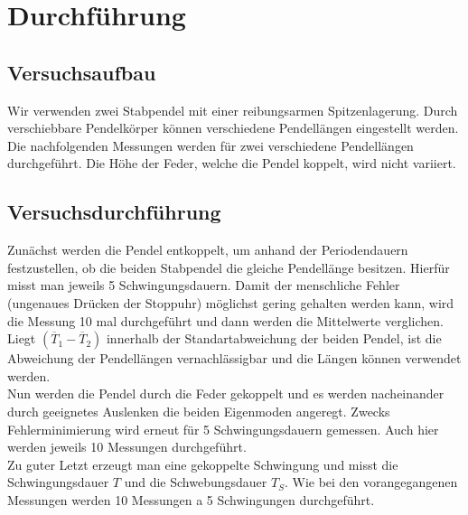 \section{Durchführung}
\label{sec:Durchführung}

\subsection{Versuchsaufbau}
    Wir verwenden zwei Stabpendel mit einer reibungsarmen Spitzenlagerung. Durch verschiebbare
    Pendelkörper können verschiedene Pendellängen eingestellt werden. Die nachfolgenden 
    Messungen werden für zwei verschiedene Pendellängen durchgeführt. Die Höhe der Feder, 
    welche die Pendel koppelt, wird nicht variiert.
\subsection{Versuchsdurchführung}
    Zunächst werden die Pendel entkoppelt, um anhand der Periodendauern festzustellen,
    ob die beiden Stabpendel die gleiche Pendellänge besitzen. Hierfür misst man jeweils 5 
    Schwingungsdauern. Damit der menschliche Fehler (ungenaues Drücken der Stoppuhr) 
    möglichst gering gehalten werden kann, wird die Messung 10 mal durchgeführt und dann 
    werden die Mittelwerte verglichen. Liegt $(\overline T_1-\overline T_2)$ innerhalb der 
    Standartabweichung der beiden Pendel, ist die Abweichung der Pendellängen vernachlässigbar 
    und die Längen können verwendet werden. \\
    Nun werden die Pendel durch die Feder gekoppelt und es werden nacheinander durch 
    geeignetes Auslenken die beiden Eigenmoden angeregt. Zwecks Fehlerminimierung wird 
    erneut für 5 Schwingungsdauern gemessen. Auch hier werden jeweils 10 Messungen durchgeführt.\\
    Zu guter Letzt erzeugt man eine gekoppelte Schwingung und misst die Schwingungsdauer $T$ und 
    die Schwebungsdauer $T_S$.  Wie bei den vorangegangenen Messungen werden 10 Messungen a 5 
    Schwingungen durchgeführt.